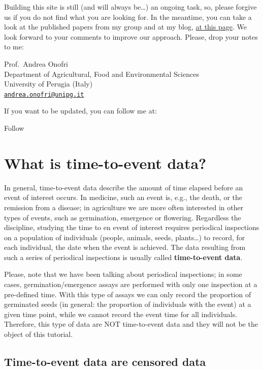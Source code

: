 \documentclass[
]{book}
\begin{document}
Building this site is still (and will always be\ldots) an ongoing task, so, please forgive us if you do not find what you are looking for. In the meantime, you can take a look at the published papers from my group and at my blog, \href{https://www.statforbiology.com/tags/drcte/}{at this page}. We look forward to your comments to improve our approach. Please, drop your notes to me:

Prof.~Andrea Onofri\\
Department of Agricultural, Food and Environmental Sciences\\
University of Perugia (Italy)\\
\href{mailto:andrea.onofri@unipg.it}{\nolinkurl{andrea.onofri@unipg.it}}

If you want to be updated, you can follow me at:

Follow

\hypertarget{what-is-time-to-event-data}{%
\chapter{What is time-to-event data?}\label{what-is-time-to-event-data}}

In general, time-to-event data describe the amount of time elapsed before an event of interest occurs. In medicine, such an event is, e.g., the death, or the remission from a disease; in agriculture we are more often interested in other types of events, such as germination, emergence or flowering. Regardless the discipline, studying the time to en event of interest requires periodical inspections on a population of individuals (people, animals, seeds, plants\ldots) to record, for each individual, the date when the event is achieved. The data resulting from such a series of periodical inspections is usually called \textbf{time-to-event data}.

Please, note that we have been talking about periodical inspections; in some cases, germination/emergence assays are performed with only one inspection at a pre-defined time. With this type of assays we can only record the proportion of germinated seeds (in general: the proportion of individuals with the event) at a given time point, while we cannot record the event time for all individuals. Therefore, this type of data are NOT time-to-event data and they will not be the object of this tutorial.

\hypertarget{time-to-event-data-are-censored-data}{%
\section{Time-to-event data are censored data}\label{time-to-event-data-are-censored-data}}
\end{document}
